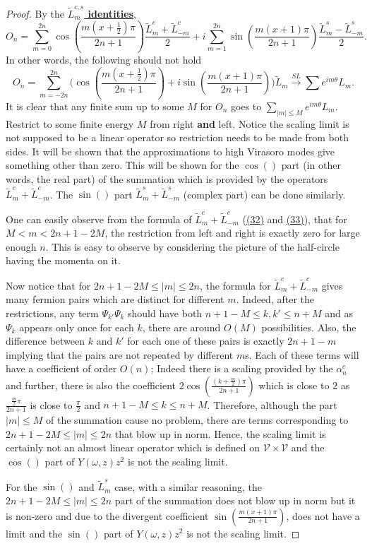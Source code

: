 \documentclass[twoside,11pt,titlepage]{amsart}
\renewcommand{\=}[1]{\stackrel{#1}{=}} %
\theoremstyle{definition}
\theoremstyle{remark}
\begin{document}
\begin{proof}
By the \hyperref[identities]{\textbf{$\widetilde{L}_m^{c,s}$ identities}},
$$O_n=\sum_{m=0}^{2n}\cos(\frac{m(x+\frac{1}{2})\pi}{2n+1})\frac{\widetilde{L}_m^c+\widetilde{L}_{-m}^c}{2}+i\sum_{m=1}^{2n}\sin(\frac{m(x+1)\pi}{2n+1})\frac{\widetilde{L}_m^s-\widetilde{L}_{-m}^s}{2}.$$
In other words, the following should not hold
$$O_n=\sum_{m=-2n}^{2n}\Big(\cos(\frac{m(x+\frac{1}{2})\pi}{2n+1})+i\sin(\frac{m(x+1)\pi}{2n+1})\Big)\widetilde{L}_m \xrightarrow{SL} \sum e^{im\theta}L_m.$$
It is clear that any finite sum up to some $M$ for $O_n$ goes to $\sum_{|m| \le M}e^{im\theta}L_m$. Restrict to some finite energy $M$ from right \textbf{and} left. Notice the scaling limit is not supposed to be a linear operator so restriction needs to be made from both sides. It will be shown that the approximations to high Virasoro modes give something other than zero. This will be shown for the $\cos()$ part (in other words, the real part) of the summation which is provided by the operators $\widetilde{L}_m^c+\widetilde{L}_{-m}^c$. The $\sin()$ part  $\widetilde{L}_m^s+\widetilde{L}_{-m}^s$ (complex part) can be done similarly.

One can easily observe from the formula of $\widetilde{L}_m^c+\widetilde{L}_{-m}^c$ (\hyperref[eq32]{(32)} and \hyperref[eq33]{(33)}), that for $M<m<2n+1-2M$, the restriction from left and right is exactly zero for large enough $n$. This is easy to observe by considering the picture of the half-circle having the momenta on it.

Now notice that for $2n+1-2M\le |m| \le 2n$, the formula for $\widetilde{L}_m^c+\widetilde{L}_{-m}^c$ gives many fermion pairs which are distinct for different $m$. Indeed, after the restrictions, any term $\Psi_{k'}\Psi_k$ should have both $n+1-M \le k,k' \le n+M$ and as $\Psi_k$ appears only once for each $k$, there are around $O(M)$ possibilities. Also, the difference between $k$ and $k'$ for each one of these pairs is exactly $2n+1-m$ implying that the pairs are not repeated by different $m$s. Each of these terms will have a coefficient of order $O(n)$; Indeed there is a scaling provided by the $\alpha_n^c$ and further, there is also the coefficient $2\cos(\frac{(k+\frac{m}{2})\pi}{2n+1})$ which is close to $2$ as $\frac{\frac{m}{2}\pi}{2n+1}$ is close to $\frac{\pi}{2}$ and $n+1-M \le k \le n+M$. Therefore, although the part $|m|\le M$ of the summation cause no problem, there are terms corresponding to $2n+1-2M\le |m| \le 2n$ that blow up in norm. Hence, the scaling limit is certainly not an almost linear operator which is defined on $\mathcal{V}\times \mathcal{V}$ and the $\cos()$ part of $Y(\omega,z)z^2$ is not the scaling limit.

For the $\sin()$ and $\widetilde{L}_m^s$ case, with a similar reasoning, the $2n+1-2M\le |m| \le 2n$ part of the summation does not blow up in norm but it is non-zero and due to the divergent coefficient $\sin(\frac{m(x+1)\pi}{2n+1})$, does not have a limit and the $\sin()$ part of $Y(\omega,z)z^2$ is not the scaling limit.
\end{proof}
\end{document}
